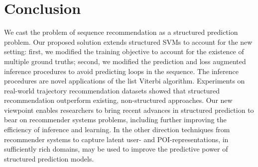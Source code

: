 
\secmoveup
\section{Conclusion}
\textmoveup

We cast the problem of sequence recommendation
as a structured prediction problem.
Our proposed solution extends structured SVMs to account for the new setting:
first, we modified the training objective to account for the existence of multiple ground truths;
second, we modified the prediction and loss augmented inference procedures to avoid predicting
loops in the sequence. The inference procedures are novel applications of the list Viterbi
algorithm.
Experiments on real-world trajectory recommendation datasets showed that
structured recommendation outperform existing, non-structured approaches.
Our new viewpoint enables researchers to bring recent advances in structured prediction
to bear on recommender systems problems,
including further improving the efficiency of inference and learning.
In the other direction techniques from recommender systems to capture latent
user- and POI-representations, in sufficiently rich domains, may be used to
improve the predictive power of structured prediction models.
